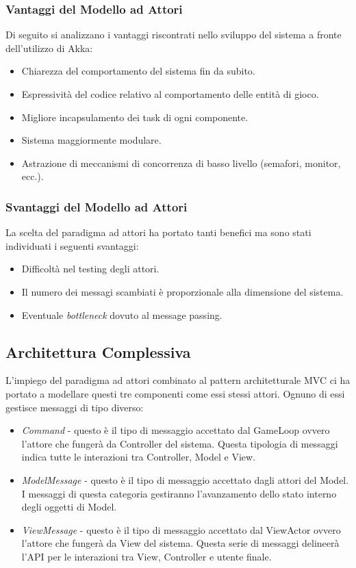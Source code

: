 \subsubsection{Vantaggi del Modello ad Attori}
Di seguito si analizzano i vantaggi riscontrati nello sviluppo del sistema a fronte dell'utilizzo di Akka:
\begin{itemize}
    \item Chiarezza del comportamento del sistema fin da subito.
    \item Espressività del codice relativo al comportamento delle entità di gioco.
    \item Migliore incapsulamento dei task di ogni componente.
    \item Sistema maggiormente modulare.
    \item Astrazione di meccanismi di concorrenza di basso livello (semafori, monitor, ecc.).
\end{itemize}

\subsubsection{Svantaggi del Modello ad Attori}
La scelta del paradigma ad attori ha portato tanti benefici ma sono stati individuati i seguenti svantaggi:
\begin{itemize}
    \item Difficoltà nel testing degli attori.
    \item Il numero dei messagi scambiati è proporzionale alla dimensione del sistema.
    \item Eventuale \textit{bottleneck} dovuto al message passing.
\end{itemize}

\subsection{Architettura Complessiva}
L'impiego del paradigma ad attori combinato al pattern architetturale MVC ci ha portato a modellare questi tre componenti
come essi stessi attori. Ognuno di essi gestisce messaggi di tipo diverso:
\begin{itemize}
    \item \textit{Command} - questo è il tipo di messaggio accettato dal GameLoop ovvero l'attore che fungerà da
    Controller del sistema. Questa tipologia di messaggi indica tutte le interazioni tra Controller, Model e View.
    \item \textit{ModelMessage} - questo è il tipo di messaggio accettato dagli attori del Model. I messaggi di questa categoria
    gestiranno l'avanzamento dello stato interno degli oggetti di Model.
    \item \textit{ViewMessage} - questo è il tipo di messaggio accettato dal ViewActor ovvero l'attore che fungerà da View
    del sistema. Questa serie di messaggi delineerà l'API per le interazioni tra View, Controller e utente finale.
\end{itemize}

